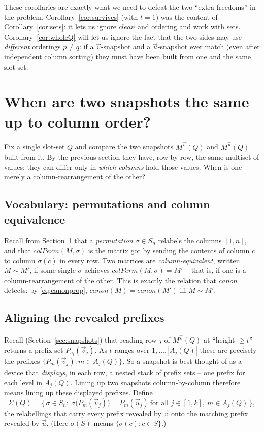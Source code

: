 \documentclass{article}
\begin{document}
These corollaries are exactly what we need to defeat the two ``extra freedoms'' in
the problem.  Corollary~\ref{cor:survives} (with $t=1$) was the content of
Corollary~\ref{cor:sets}: it lets us ignore $clean$ and ordering and work with
sets.  Corollary~\ref{cor:wholeQ} will let us ignore the fact that the two sides
may use \emph{different} orderings $p\ne q$: if a $\vec v$-snapshot and a
$\vec u$-snapshot ever match (even after independent column sorting) they must have
been built from one and the same slot-set.


\section{When are two snapshots the same up to column order?}
\label{sec:align}

Fix a single slot-set $Q$ and compare the two snapshots $M^{\vec v}(Q)$ and
$M^{\vec u}(Q)$ built from it.  By the previous section they have, row by row, the
same multiset of values; they can differ only in \emph{which columns} hold those
values.  When is one merely a column-rearrangement of the other?

\subsection*{Vocabulary: permutations and column equivalence}

\label{def:colequiv}Recall from Section~1 that a \emph{permutation} $\sigma\in S_n$ relabels the columns
$[1,n]$, and that $colPerm(M,\sigma)$ is the matrix got by sending the contents of
column $c$ to column $\sigma(c)$ in every row.  Two matrices are
\emph{column-equivalent}, written $M\sim M'$, if some single $\sigma$ achieves
$colPerm(M,\sigma)=M'$ -- that is, if one is a column-rearrangement of the other.
This is exactly the relation that $canon$ detects: by \eqref{eq:canonprop},
$canon(M)=canon(M')$ iff $M\sim M'$.

\subsection*{Aligning the revealed prefixes}

Recall (Section~\ref{sec:snapshots}) that reading row $j$ of $M^{\vec v}(Q)$ at
``height $\ge t$'' returns a prefix set $P_{a_t}(\vec v_j)$.  As $t$ ranges over
$1,\ldots,|A_j(Q)|$ these are precisely the prefixes
$\{P_m(\vec v_j):m\in A_j(Q)\}$.  So a snapshot is best thought of as a device that
\emph{displays}, in each row, a nested stack of prefix sets -- one prefix for each
level in $A_j(Q)$.  Lining up two snapshots column-by-column therefore means lining
up these displayed prefixes.  Define\label{def:sigma}
\[
\Sigma(Q)=\bigl\{\,\sigma\in S_n:\ \sigma\bigl(P_m(\vec v_j)\bigr)=P_m(\vec u_j)
\ \text{for all }j\in[1,k],\ m\in A_j(Q)\,\bigr\},
\]
the relabellings that carry every prefix revealed by $\vec v$ onto the matching
prefix revealed by $\vec u$.  (Here $\sigma(S)$ means $\{\sigma(c):c\in S\}$.)
\end{document}
